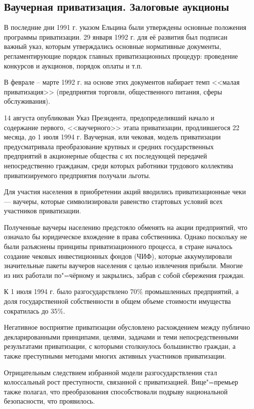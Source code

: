 \subsection{Ваучерная приватизация. Залоговые аукционы}
В последние дни 1991 г. указом Ельцина были утверждены основные положения программы приватизации. 29 января 1992 г. для её развития был подписан важный указ, которым утверждались основные нормативные документы, регламентирующие порядок главных приватизационных процедур: проведение конкурсов и аукционов, порядок оплаты и т.п.

В феврале -- марте 1992 г. на основе этих документов набирает темп <<малая приватизация>> (предприятия торговли, общественного питания, сферы обслуживания).

14 августа опубликован Указ Президента, предопределивший начало и содержание первого, <<ваучерного>> этапа приватизации, продлившегося 22 месяца, до 1 июля 1994 г. Ваучерная, или чековая, модель приватизации предусматривала преобразование крупных и средних государственных предприятий в акционерные общества с их последующей передачей непосредственно гражданам, среди которых работники трудового коллектива приватизируемого предприятия получали льготы.

Для участия населения в приобретении акций вводились приватизационные чеки --- ваучеры, которые символизировали равенство стартовых условий всех участников приватизации.

Полученные ваучеры населению предстояло обменять на акции предприятий, что означало бы юридическое вхождение в права собственника. Однако поскольку не были разъяснены принципы приватизационного процесса, в стране началось создание чековых инвестиционных фондов (ЧИФ), которые аккумулировали значительные пакеты ваучеров населения с целью извлечения прибыли. Многие из них работали по"=чёрному и закрылись, забрав с собой сбережения граждан.

К 1 июля 1994 г. было разгосударствлено 70\% промышленных предприятий, а доля государственной собственности в общем объеме стоимости имущества сократилась до 35\%.

Негативное восприятие приватизации обусловлено расхождением между публично декларированными принципами, целями, задачами и теми непосредственными результатами приватизации, с которыми столкнулось большинство граждан, а также преступными методами многих активных участников приватизации.

Отрицательным следствием избранной модели разгосударствления стал колоссальный рост преступности, связанной с приватизацией. Вице"=премьер также полагал, что преобразования способствовали подрыву национальной безопасности, что проявилось.

